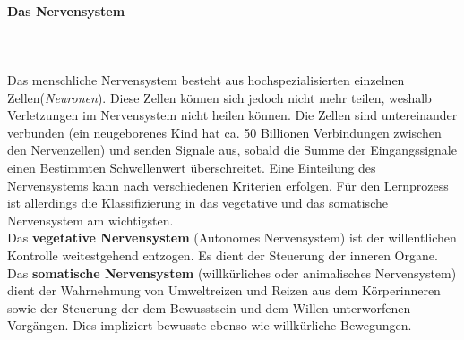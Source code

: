 \paragraph{Das Nervensystem}~\\
\\
Das menschliche Nervensystem besteht aus hochspezialisierten einzelnen Zellen({\it Neuronen}). Diese Zellen können sich jedoch nicht mehr teilen, weshalb Verletzungen im Nervensystem nicht heilen können. Die Zellen sind untereinander verbunden (ein neugeborenes Kind hat ca. 50 Billionen Verbindungen zwischen den Nervenzellen) und senden Signale aus, sobald die Summe der Eingangssignale einen Bestimmten Schwellenwert überschreitet. Eine Einteilung des Nervensystems kann nach verschiedenen Kriterien erfolgen. Für den Lernprozess ist allerdings die Klassifizierung in das vegetative und das somatische Nervensystem am wichtigsten.\\
Das {\bf vegetative Nervensystem} (Autonomes Nervensystem) ist der willentlichen Kontrolle weitestgehend entzogen. Es dient der Steuerung der inneren Organe.\\
Das {\bf somatische Nervensystem} (willkürliches oder animalisches Nervensystem) dient der Wahrnehmung von Umweltreizen und Reizen aus dem Körperinneren sowie der Steuerung der dem Bewusstsein und dem Willen unterworfenen Vorgängen. Dies impliziert bewusste ebenso wie willkürliche Bewegungen.\\


